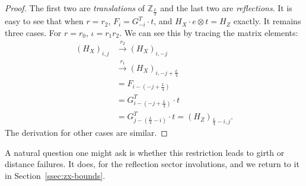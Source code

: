 \begin{proof}
The first two are \emph{translations} of $\mathbb{Z}_\frac L2$ and the last two are \emph{reflections}. It is easy to see that when $r =r_2$, $F_i = G_{-i}^T\cdot t$, and $H_X\cdot e\otimes t = H_Z$ exactly. It remains three cases. For $r = r_0$, $\iota = r_1r_2$. We can see this by tracing the matrix elements:
\begin{align*}
(H_X)_{i,j} 
&\xrightarrow{r_2} (H_X)_{i,-j}\\
&\xrightarrow{r_1} (H_X)_{i, -j+\frac L4} \\
&= F_{i-(-j+\frac L4)} \\
&=G^T_{i-(-j+\frac L4)}\cdot t \\
&=G^T_{j-(\frac L4-i)}\cdot t =(H_Z)_{\frac L4-i,j}. 
\end{align*}
The derivation for other cases are similar.
\end{proof}



A natural question one might ask is whether this restriction leads to girth or distance failures. It does, for the reflection sector involutions, and we return to it in Section~\ref{ssec:zx-bounds}.
